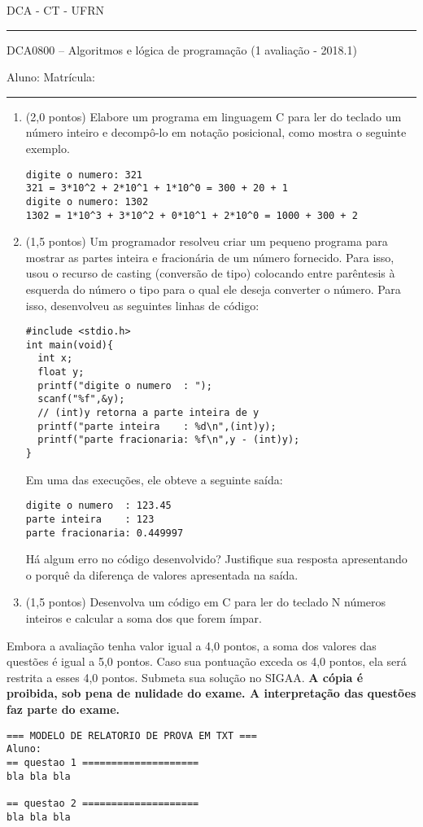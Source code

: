 \documentclass[12pt,a4paper]{article}
\begin{document}
\begin{center}\scshape
  DCA - CT - UFRN
\rule{\linewidth}{1pt}
\end{center}
 
\begin{center}\Large
DCA0800 -- Algoritmos e lógica de programação (1\raisebox{0.5ex}{\small a} avaliação - 2018.1)\\
\end{center}
\noindent Aluno:\hrulefill \vspace{2mm} Matrícula: \rule{2.5cm}{0.4pt}

\begin{enumerate}


\item (2,0 pontos) Elabore um programa em linguagem C para ler do teclado um número inteiro e decompô-lo em notação posicional, como mostra o seguinte exemplo.
\begin{verbatim}
digite o numero: 321
321 = 3*10^2 + 2*10^1 + 1*10^0 = 300 + 20 + 1
digite o numero: 1302
1302 = 1*10^3 + 3*10^2 + 0*10^1 + 2*10^0 = 1000 + 300 + 2
\end{verbatim}

\item (1,5 pontos) Um programador resolveu criar um pequeno programa
  para mostrar as partes inteira e fracionária de um número
  fornecido. Para isso, usou o recurso de casting (conversão de tipo)
  colocando entre parêntesis à esquerda do número o tipo para o qual
  ele deseja converter o número. Para isso, desenvolveu as seguintes
  linhas de código:
\begin{verbatim}
#include <stdio.h>
int main(void){
  int x;
  float y;
  printf("digite o numero  : ");
  scanf("%f",&y);
  // (int)y retorna a parte inteira de y
  printf("parte inteira    : %d\n",(int)y); 
  printf("parte fracionaria: %f\n",y - (int)y);
}
\end{verbatim}

Em uma das execuções, ele obteve a seguinte saída:
\begin{verbatim}
digite o numero  : 123.45
parte inteira    : 123
parte fracionaria: 0.449997
\end{verbatim}

Há algum erro no código desenvolvido? Justifique sua resposta
apresentando o porquê da diferença de valores apresentada na saída.

\item (1,5 pontos) Desenvolva um código em C para ler do teclado N
  números inteiros e calcular a soma dos que forem ímpar.

\end{enumerate}

Embora a avaliação tenha valor igual a 4,0 pontos, a soma dos valores
das questões é igual a 5,0 pontos. Caso sua pontuação exceda os 4,0
pontos, ela será restrita a esses 4,0 pontos.  Submeta sua solução no
SIGAA. {\bf A cópia é proibida, sob pena de nulidade do exame. A
  interpretação das questões faz parte do exame.}
\begin{verbatim}
=== MODELO DE RELATORIO DE PROVA EM TXT ===
Aluno:
== questao 1 ====================
bla bla bla

== questao 2 ====================
bla bla bla
\end{verbatim}
\end{document}
